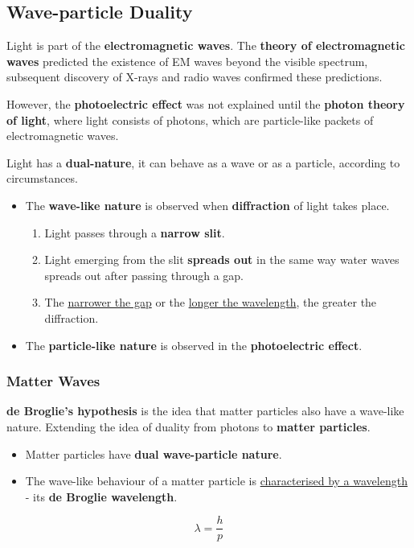 \subsection{Wave-particle Duality}

Light is part of the \textbf{electromagnetic waves}. The \textbf{theory of electromagnetic waves} predicted the existence of EM waves beyond the visible spectrum, subsequent discovery of X-rays and radio waves confirmed these predictions.

However, the \textbf{photoelectric effect} was not explained until the \textbf{photon theory of light}, where light consists of photons, which are particle-like packets of electromagnetic waves.

Light has a \textbf{dual-nature}, it can behave as a wave or as a particle, according to circumstances.
\begin{itemize}
    \item The \textbf{wave-like nature} is observed when \textbf{diffraction} of light takes place.
        \begin{enumerate}
            \item Light passes through a \textbf{narrow slit}.
            \item Light emerging from the slit \textbf{spreads out} in the same way water waves spreads out after passing through a gap.
            \item The \underline{narrower the gap} or the \underline{longer the wavelength}, the greater the diffraction.
        \end{enumerate}

    \item The \textbf{particle-like nature} is observed in the \textbf{photoelectric effect}.
\end{itemize}

\subsubsection*{Matter Waves}
\textbf{de Broglie's hypothesis} is the idea that matter particles also have a wave-like nature. Extending the idea of duality from photons to \textbf{matter particles}.
\begin{itemize}
    \item Matter particles have \textbf{dual wave-particle nature}.
    \item The wave-like behaviour of a matter particle is \underline{characterised by a wavelength} - its \textbf{de Broglie wavelength}.
\end{itemize}
$$\lambda=\frac{h}{p}$$

